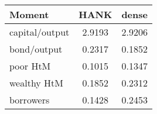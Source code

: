 \begin{tabular}{lcc} 
\toprule 
Moment & HANK & dense\\ 
\midrule 
 capital/output & 2.9193 & 2.9206 \\ 
 bond/output & 0.2317 & 0.1852 \\ 
 poor HtM & 0.1015 & 0.1347 \\ 
 wealthy HtM & 0.1852 & 0.2312 \\ 
 borrowers & 0.1428 & 0.2453 \\ 
\bottomrule
\end{tabular}

